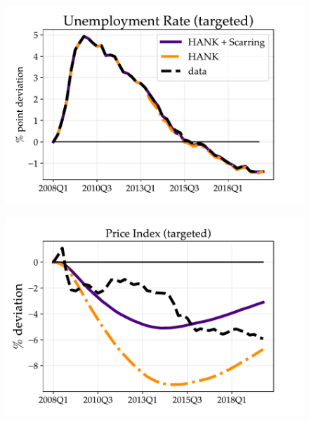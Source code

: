 \begin{figure}[H] %
\centering
\begin{minipage}{0.51\textwidth}
\includegraphics[scale=.55]{text/chapter1/Figures/GR_sim/Urate}
 \label{fig:a}
\end{minipage}\hspace*{\fill}
\begin{minipage}{0.51\textwidth}
\includegraphics[scale=.55]{text/chapter1/Figures/GR_sim/PCE_defl}
 \label{fig:b}
\end{minipage}


\end{figure}
